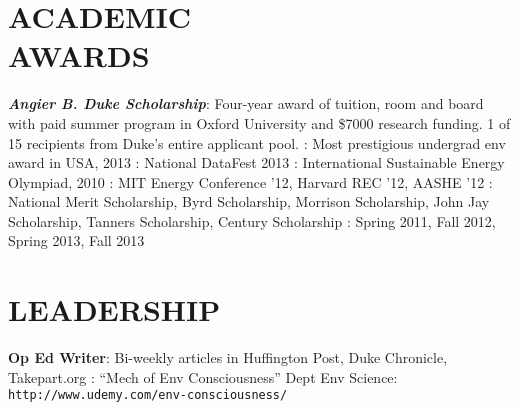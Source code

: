 \documentclass[margin]{res}
\begin{document}
\begin{resume}
 
\section{ACADEMIC \\ AWARDS}  

{\sl \bf Angier B. Duke Scholarship}: Four-year award of tuition, room and board with paid summer program in Oxford University and \$7000 research funding. 1 of 15 recipients from Duke's entire applicant pool. 
: Most prestigious undergrad env award in USA, 2013
: National DataFest 2013
: International Sustainable Energy Olympiad, 2010
: MIT Energy Conference '12, Harvard REC '12, AASHE '12
: National Merit Scholarship, Byrd Scholarship, Morrison Scholarship,  John Jay Scholarship, Tanners Scholarship, Century Scholarship %
: Spring 2011, Fall 2012, Spring 2013, Fall 2013

\section{LEADERSHIP}

 {\bf Op Ed Writer}: Bi-weekly articles in Huffington Post, Duke Chronicle, Takepart.org %
: ``Mech of Env Consciousness'' Dept Env Science: \texttt{http://www.udemy.com/env-consciousness/}


\end{resume}
\end{document}
